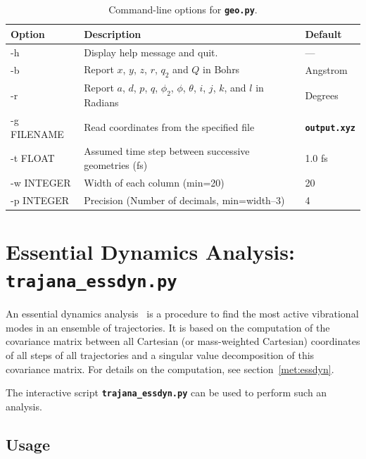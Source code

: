\documentclass[a4paper,10pt,DIV=15,openany,twoside=false]{scrbook}
\newcommand{\ttt}[1]{\textbf{\texttt{#1}}}
\begin{document}
\begin{table}[htb]
  \centering
  \caption{Command-line options for \ttt{geo.py}. }
  \label{tab:Geo_options}
  \begin{tabular}{>{\ttfamily}lll}
    \toprule
    \rmfamily Option         &Description    &Default\\
    \midrule
    -h          &Display help message and quit.         &---       \\
    -b          &Report $x$, $y$, $z$, $r$, $q_2$ and $Q$ in Bohrs       &Angstrom\\
    -r          &Report $a$, $d$, $p$, $q$, $\phi_2$, $\phi$, $\theta$, $i$, $j$, $k$, and $l$ in Radians         &Degrees\\
    -g FILENAME &Read coordinates from the specified file       &\ttt{output.xyz}\\
    -t FLOAT    &Assumed time step between successive geometries (fs)    &1.0 fs\\
    -w INTEGER  &Width of each column (min=20)                   &20\\
    -p INTEGER  &Precision (Number of decimals, min=width--3)         &4\\
    \bottomrule
  \end{tabular}
\end{table}






\section{Essential Dynamics Analysis: \ttt{trajana\_essdyn.py}}\label{sec:trajana_essdyn.py}

An essential dynamics analysis~\cite{Amadei1993PSFB} is a procedure to find the most active vibrational modes in an ensemble of trajectories.
It is based on the computation of the covariance matrix between all Cartesian (or mass-weighted Cartesian) coordinates of all steps of all trajectories and a singular value decomposition of this covariance matrix.
For details on the computation, see section~\ref{met:essdyn}.

The interactive script \ttt{trajana\_essdyn.py} can be used to perform such an analysis.

\subsection{Usage}
\end{document}
